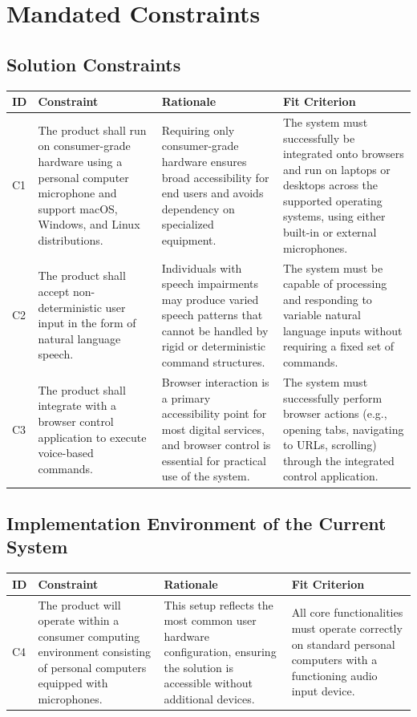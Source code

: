 \documentclass[12pt]{article}
\begin{document}
\section{Mandated Constraints}
\subsection{Solution Constraints}

\begin{tabularx}{\textwidth}{p{1cm}X X X}
\toprule
\textbf{ID} & \textbf{Constraint} & \textbf{Rationale} & \textbf{Fit Criterion} \\
\midrule
C1 & The product shall run on consumer-grade hardware using a personal computer microphone and support macOS, Windows, and Linux distributions. & Requiring only consumer-grade hardware ensures broad accessibility for end users and avoids dependency on specialized equipment. & The system must successfully be integrated onto browsers and run on laptops or desktops across the supported operating systems, using either built-in or external microphones. \\
\hline
C2 & The product shall accept non-deterministic user input in the form of natural language speech. & Individuals with speech impairments may produce varied speech patterns that cannot be handled by rigid or deterministic command structures. & The system must be capable of processing and responding to variable natural language inputs without requiring a fixed set of commands. \\
\hline
C3 & The product shall integrate with a browser control application to execute voice-based commands. & Browser interaction is a primary accessibility point for most digital services, and browser control is essential for practical use of the system. & The system must successfully perform browser actions (e.g., opening tabs, navigating to URLs, scrolling) through the integrated control application. \\
\bottomrule
\end{tabularx}


\subsection{Implementation Environment of the Current System}


\begin{tabularx}{\textwidth}{p{1cm}X X X}
\toprule
\textbf{ID} & \textbf{Constraint} & \textbf{Rationale} & \textbf{Fit Criterion} \\
\midrule
C4 & The product will operate within a consumer computing environment consisting of personal computers equipped with microphones. & This setup reflects the most common user hardware configuration, ensuring the solution is accessible without additional devices. & All core functionalities must operate correctly on standard personal computers with a functioning audio input device. \\
\bottomrule
\end{tabularx}
\end{document}

